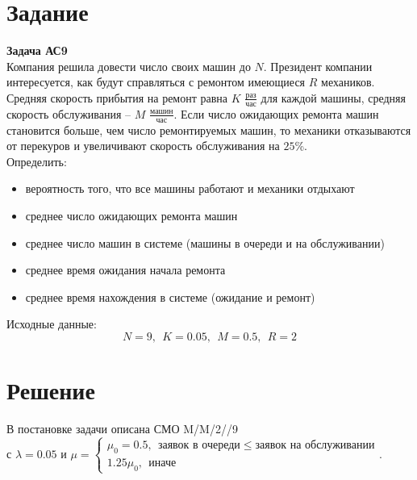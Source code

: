 





\section{Задание}

\textbf{Задача АС9}\\

Компания решила довести число своих машин до $N$. Президент компании интересуется, как будут справляться с ремонтом имеющиеся $R$ механиков. Средняя скорость прибытия на ремонт равна $K$ $\frac{\text{раз}}{\text{час}}$ для каждой машины, средняя скорость обслуживания – $M$  $\frac{\text{машин}}{\text{час}}$. Если число ожидающих ремонта машин становится больше, чем число ремонтируемых машин, то механики отказываются от перекуров и увеличивают скорость обслуживания на $25$\%.\\

Определить:
\begin{itemize}
	\item вероятность того, что все машины работают и механики отдыхают
	\item среднее число ожидающих ремонта машин
	\item среднее число машин в системе (машины в очереди и на обслуживании)
	\item среднее время ожидания начала ремонта
	\item среднее время нахождения в системе (ожидание и ремонт)
\end{itemize}

Исходные данные:\\

\begin{equation*}
	N = 9,\ \ K = 0.05,\ \ M = 0.5,\ \ R = 2
\end{equation*}

\section{Решение}

В постановке задачи описана СМО M/M/2//9\\ с $\lambda = 0.05$ и $\mu = \begin{cases} \mu_0 = 0.5,\ \ \text{заявок в очереди} \leq \text{заявок на обслуживании}\\ 1.25 \mu_0,\ \  \text{иначе}\end{cases}$. %


